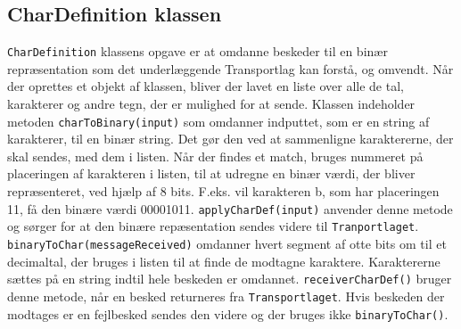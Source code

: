 \subsection{CharDefinition klassen}
\texttt{CharDefinition} klassens opgave er at omdanne beskeder til en binær repræsentation som det underlæggende Transportlag kan forstå, og omvendt. Når der oprettes et objekt af klassen, bliver der lavet en liste over alle de tal, karakterer og andre tegn, der er mulighed for at sende.
\newline
Klassen indeholder metoden \texttt{charToBinary(input)} som omdanner indputtet, som er en string af karakterer, til en binær string. Det gør den ved at sammenligne karaktererne, der skal sendes, med dem i listen. Når der findes et match, bruges nummeret på placeringen af karakteren i listen, til at udregne en binær værdi, der bliver repræsenteret, ved hjælp af 8 bits. F.eks. vil karakteren b, som har placeringen 11, få den binære værdi 00001011.
\newline
\texttt{applyCharDef(input)} anvender denne metode og sørger for at den binære repæsentation sendes videre til \texttt{Tranportlaget}.
\newline
\texttt{binaryToChar(messageReceived)} omdanner hvert segment af otte bits om til et decimaltal, der bruges i listen til at finde de modtagne karaktere. Karaktererne sættes på en string indtil hele beskeden er omdannet.
\newline
\texttt{receiverCharDef()} bruger denne metode, når en besked returneres fra \texttt{Transportlaget}. Hvis beskeden der modtages er en fejlbesked sendes den videre og der bruges ikke \texttt{binaryToChar()}.

